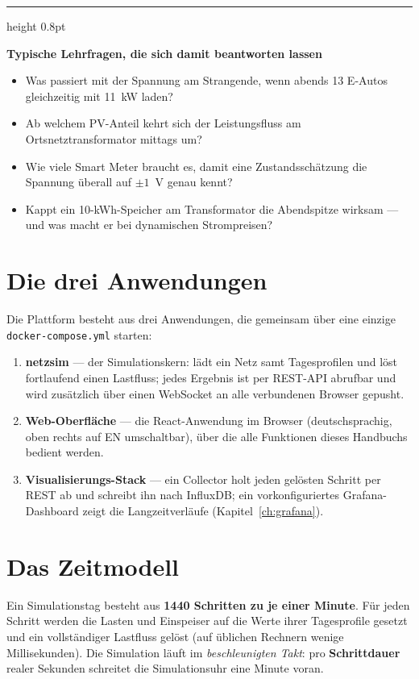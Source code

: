 \documentclass[11pt,a4paper,parskip=half]{scrreprt}
\newcommand{\ui}[1]{\textsf{\bfseries #1}}          %
\newenvironment{beispiel}[1][Beispiel]
  {\par\medskip
   {\color{bsp}\hrule height 0.8pt}\nopagebreak\smallskip
   \noindent\textbf{\textsf{\textcolor{bsp}{#1}}}\quad\ignorespaces}
  {\par\nopagebreak\smallskip{\color{bsp}\hrule height 0.8pt}\par\medskip}
\begin{document}
\begin{beispiel}[Typische Lehrfragen, die sich damit beantworten lassen]
\begin{itemize}[nosep]
  \item Was passiert mit der Spannung am Strangende, wenn abends
    13 E-Autos gleichzeitig mit 11~kW laden?
  \item Ab welchem PV-Anteil kehrt sich der Leistungsfluss am
    Ortsnetztransformator mittags um?
  \item Wie viele Smart Meter braucht es, damit eine
    Zustandsschätzung die Spannung überall auf $\pm 1$~V genau kennt?
  \item Kappt ein 10-kWh-Speicher am Transformator die Abendspitze
    wirksam --- und was macht er bei dynamischen Strompreisen?
\end{itemize}
\end{beispiel}

\section{Die drei Anwendungen}

Die Plattform besteht aus drei Anwendungen, die gemeinsam über eine
einzige \texttt{docker-compose.yml} starten:

\begin{enumerate}
  \item \textbf{netzsim} --- der Simulationskern: lädt ein Netz samt
    Tagesprofilen und löst fortlaufend einen Lastfluss; jedes Ergebnis
    ist per REST-API abrufbar und wird zusätzlich über einen
    WebSocket an alle verbundenen Browser gepusht.
  \item \textbf{Web-Oberfläche} --- die React-Anwendung im Browser
    (deutschsprachig, oben rechts auf EN umschaltbar), über die alle
    Funktionen dieses Handbuchs bedient werden.
  \item \textbf{Visualisierungs-Stack} --- ein Collector holt jeden
    gelösten Schritt per REST ab und schreibt ihn nach InfluxDB;
    ein vorkonfiguriertes Grafana-Dashboard zeigt die
    Langzeitverläufe (Kapitel~\ref{ch:grafana}).
\end{enumerate}

\section{Das Zeitmodell}
\label{sec:zeitmodell}

Ein Simulationstag besteht aus \textbf{1440 Schritten zu je einer
Minute}. Für jeden Schritt werden die Lasten und Einspeiser auf die
Werte ihrer Tagesprofile gesetzt und ein vollständiger Lastfluss
gelöst (auf üblichen Rechnern wenige Millisekunden). Die Simulation
läuft im \emph{beschleunigten Takt}: pro \ui{Schrittdauer} realer
Sekunden schreitet die Simulationsuhr eine Minute voran.
\end{document}
